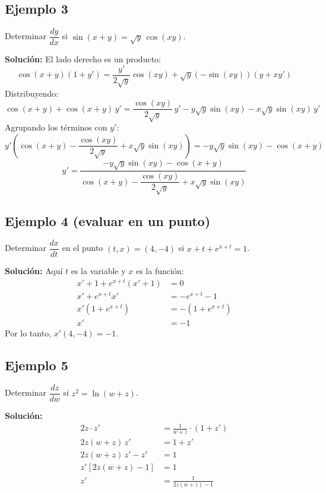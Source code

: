 \documentclass[12pt]{article}
\begin{document}
\subsection{Ejemplo 3}
Determinar $\dfrac{dy}{dx}$ si $\sin(x + y) = \sqrt{y}\,\cos(xy)$.

\textbf{Solución:} El lado derecho es un producto:
\[
\cos(x + y)(1 + y') = \frac{y'}{2\sqrt{y}}\cos(xy) + \sqrt{y}\left(-\sin(xy)\right)(y + x y')
\]
Distribuyendo:
\[
\cos(x + y) + \cos(x + y)\,y' = \frac{\cos(xy)}{2\sqrt{y}}\,y' - y\sqrt{y}\sin(xy) - x\sqrt{y}\sin(xy)\,y'
\]
Agrupando los términos con $y'$:
\[
y'\left(\cos(x + y) - \frac{\cos(xy)}{2\sqrt{y}} + x\sqrt{y}\sin(xy)\right) = -y\sqrt{y}\sin(xy) - \cos(x + y)
\]
\[
y' = \frac{-y\sqrt{y}\sin(xy) - \cos(x + y)}{\cos(x + y) - \dfrac{\cos(xy)}{2\sqrt{y}} + x\sqrt{y}\sin(xy)}
\]

\subsection{Ejemplo 4 (evaluar en un punto)}
Determinar $\dfrac{dx}{dt}$ en el punto $(t, x) = (4, -4)$ si $x + t + e^{x + t} = 1$.

\textbf{Solución:} Aquí $t$ es la variable y $x$ es la función:
\begin{align*}
x' + 1 + e^{x + t}(x' + 1) &= 0 \\
x' + e^{x + t} x' &= -e^{x + t} - 1 \\
x'\left(1 + e^{x + t}\right) &= -\left(1 + e^{x + t}\right) \\
x' &= -1
\end{align*}
Por lo tanto, $x'(4, -4) = -1$.

\subsection{Ejemplo 5}
Determinar $\dfrac{dz}{dw}$ si $z^2 = \ln(w + z)$.

\textbf{Solución:}
\begin{align*}
2z \cdot z' &= \frac{1}{w + z} \cdot (1 + z') \\
2z(w + z)\,z' &= 1 + z' \\
2z(w + z)\,z' - z' &= 1 \\
z'\left[2z(w + z) - 1\right] &= 1 \\
z' &= \frac{1}{2z(w + z) - 1}
\end{align*}
\end{document}
